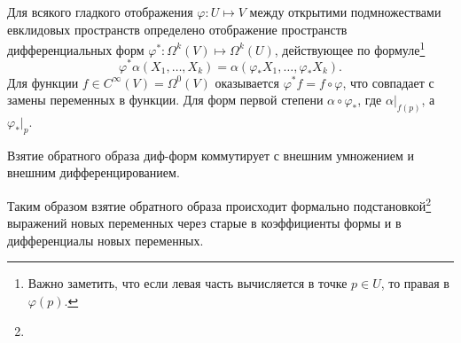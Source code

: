 \begin{to_def} 
    Для всякого гладкого отображения $\varphi \colon U \mapsto V$ между открытими подмножествами евклидовых пространств определено отображение пространств дифференциальных форм $\varphi^* \colon \Omega^k(V) \mapsto \Omega^k (U)$, действующее по формуле\footnote{
        Важно заметить, что если левая часть вычисляется в точке $p \in U$, то правая в $\varphi(p)$.
    }
\begin{equation*}
    \varphi^* \alpha (X_1, \ldots, X_k) = \alpha(\varphi_* X_1,\ldots,\varphi_* X_k).
\end{equation*}
Для функции $f \in C^{\infty}(V) = \Omega^0 (V)$ оказывается $\varphi^* f = f \circ \varphi$, что совпадает с замены переменных в функции. Для форм первой степени $\alpha \circ \varphi_*$, где $\alpha|_{f(p)}$, а $\varphi_*|_p$. 
\end{to_def}

\begin{to_lem} 
    Взятие обратного образа диф-форм коммутирует с внешним умножением и внешним дифференцированием.  
\end{to_lem}


Таким образом взятие обратного образа происходит формально подстановкой\footnote{
} выражений новых переменных через старые в коэффициенты формы и в дифференциалы новых переменных.



